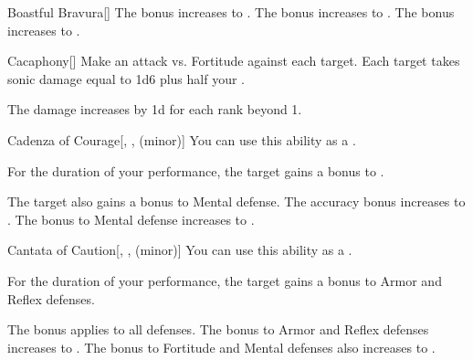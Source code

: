 {\begin{freeability}{Boastful Bravura}[]
                \rankline
                 The bonus increases to .
                 The bonus increases to .
                 The bonus increases to .
            \end{freeability}

            \begin{freeability}{Cacaphony}[]
                Make an attack vs. Fortitude against each target.
                \hit Each target takes sonic damage equal to 1d6 plus half your .

                \rankline
                The damage increases by \plus1d for each rank beyond 1.
            \end{freeability}

            \begin{freeability}{Cadenza of Courage}[, ,  (minor)]
                You can use this ability as a .

                For the duration of your performance, the target gains a  bonus to .

                \rankline
                 The target also gains a  bonus to Mental defense.
                 The accuracy bonus increases to .
                 The bonus to Mental defense increases to .
            \end{freeability}

            \begin{freeability}{Cantata of Caution}[, ,  (minor)]
                You can use this ability as a .

                For the duration of your performance, the target gains a  bonus to Armor and Reflex defenses.

                \rankline
                 The bonus applies to all defenses.
                 The bonus to Armor and Reflex defenses increases to .
                 The bonus to Fortitude and Mental defenses also increases to .
            \end{freeability}

}

